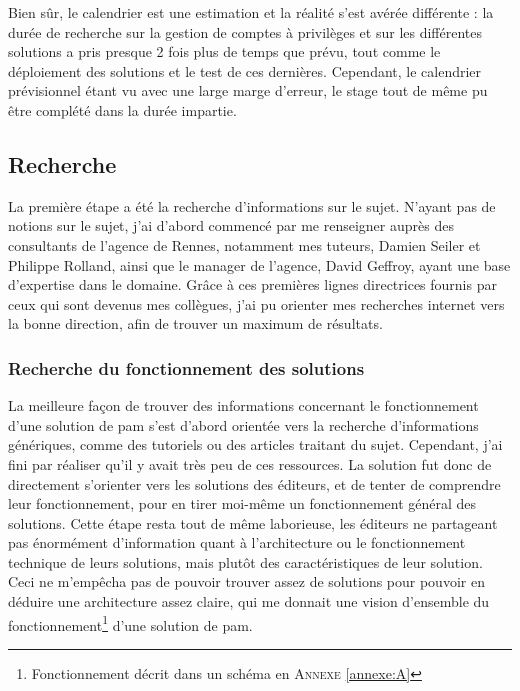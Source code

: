 Bien sûr, le calendrier est une estimation et la réalité s'est avérée différente : la durée de recherche sur la gestion de comptes à privilèges et sur les différentes solutions a pris presque 2 fois plus de temps que prévu, tout comme le déploiement des solutions et le test de ces dernières. Cependant, le calendrier prévisionnel étant vu avec une large marge d'erreur, le stage tout de même pu être complété dans la durée impartie.

\subsection{Recherche}
\label{subsec:recherche}

La première étape a été la recherche d'informations sur le sujet. N'ayant pas de notions sur le sujet, j'ai d'abord commencé par me renseigner auprès des consultants de l'agence de Rennes, notamment mes tuteurs, Damien Seiler et Philippe Rolland, ainsi que le manager de l'agence, David Geffroy, ayant une base d'expertise dans le domaine. Grâce à ces premières lignes directrices fournis par ceux qui sont devenus mes collègues, j'ai pu orienter mes recherches internet vers la bonne direction, afin de trouver un maximum de résultats.

\subsubsection{Recherche du fonctionnement des solutions}
\label{par:fct_sol}
La meilleure façon de trouver des informations concernant le fonctionnement d'une solution de \gls{pam} s'est d'abord orientée vers la recherche d'informations génériques, comme des tutoriels ou des articles traitant du sujet. Cependant, j'ai fini par réaliser qu'il y avait très peu de ces ressources. La solution fut donc de directement s'orienter vers les solutions des éditeurs, et de tenter de comprendre leur fonctionnement, pour en tirer moi-même un fonctionnement général des solutions. Cette étape resta tout de même laborieuse, les éditeurs ne partageant pas énormément d'information quant à l'architecture ou le fonctionnement technique de leurs solutions, mais plutôt des caractéristiques de leur solution. Ceci ne m'empêcha pas de pouvoir trouver assez de solutions pour pouvoir en déduire une architecture assez claire, qui me donnait une vision d'ensemble du fonctionnement\footnote{Fonctionnement décrit dans un schéma en \textsc{Annexe} \ref{annexe:A}} d'une solution de \gls{pam}.\\

